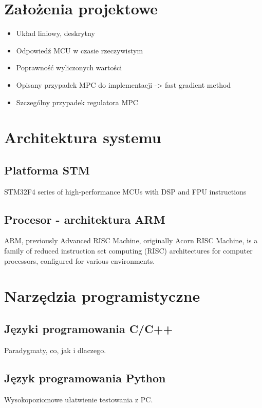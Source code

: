 \section{Założenia projektowe} \label{sec:assumptions}
\begin{itemize}
	\item Układ liniowy, deskrytny
	\item Odpowiedź MCU w czasie rzeczywistym
    \item Poprawność wyliczonych wartości
    \item Opisany przypadek MPC do implementacji -> fast gradient method
    \item Szczególny przypadek regulatora MPC
\end{itemize}

\section{Architektura systemu} \label{sec:system}

\subsection{Platforma STM} \label{sec:stm}
STM32F4 series of high-performance MCUs with DSP and FPU instructions

\subsection{Procesor - architektura ARM} \label{sec:arm}
ARM, previously Advanced RISC Machine, originally Acorn RISC Machine, is a family of reduced
instruction set computing (RISC) architectures for computer processors, configured for various
environments.

\section{Narzędzia programistyczne} \label{sec:prog}

\subsection{Języki programowania C/C++} \label{sec:cpp}
Paradygmaty, co, jak i dlaczego.

\subsection{Język programowania Python} \label{sec:python}
Wysokopoziomowe ułatwienie testowania z PC.

